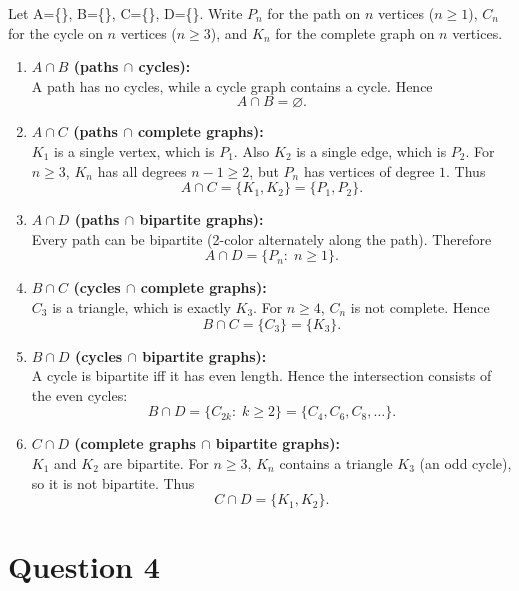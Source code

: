 \documentclass[11pt]{article}
\begin{document}
\medskip

Let \quad
A=\{\},\;
B=\{\},\;
C=\{\},\;
D=\{\}.
\newline
Write $P_n$ for the path on $n$ vertices ($n\ge1$), $C_n$ for the cycle on $n$ vertices ($n\ge3$),
and $K_n$ for the complete graph on $n$ vertices.

\begin{enumerate}
\item \textbf{$A\cap B$ (paths $\cap$ cycles):} \\
A path has no cycles, while a cycle graph contains a cycle. Hence
\[
A\cap B=\varnothing.
\]

\item \textbf{$A\cap C$ (paths $\cap$ complete graphs):} \\
$K_1$ is a single vertex, which is $P_1$. Also $K_2$ is a single edge, which is $P_2$.
For $n\ge3$, $K_n$ has all degrees $n-1\ge2$, but $P_n$ has vertices of degree $1$.
Thus
\[
A\cap C=\{K_1,K_2\}=\{P_1,P_2\}.
\]

\item \textbf{$A\cap D$ (paths $\cap$ bipartite graphs):} \\
Every path can be bipartite (2-color alternately along the path).
Therefore
\[
A\cap D=\{P_n:\; n\ge 1\}.
\]

\item \textbf{$B\cap C$ (cycles $\cap$ complete graphs):} \\
$C_3$ is a triangle, which is exactly $K_3$. For $n\ge4$, $C_n$ is not complete.
Hence
\[
B\cap C=\{C_3\}=\{K_3\}.
\]

\item \textbf{$B\cap D$ (cycles $\cap$ bipartite graphs):} \\
A cycle is bipartite iff it has even length. Hence the intersection consists of the even cycles:
\[
B\cap D=\{C_{2k}:\; k\ge2\}=\{C_4,C_6,C_8,\dots\}.
\]

\item \textbf{$C\cap D$ (complete graphs $\cap$ bipartite graphs):} \\
$K_1$ and $K_2$ are bipartite. For $n\ge3$, $K_n$ contains a triangle $K_3$ (an odd cycle),
so it is not bipartite. Thus
\[
C\cap D=\{K_1,K_2\}.
\]
\end{enumerate}

\newpage

\section*{Question 4}
\end{document}
